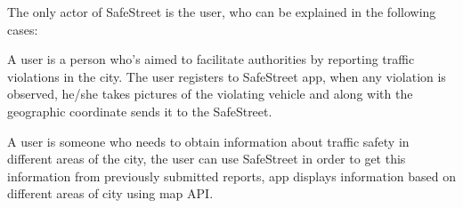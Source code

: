 The only actor of SafeStreet is the user, who can be explained in the following cases:

A user is a person who's aimed to facilitate authorities by reporting traffic violations in the city. The user registers to SafeStreet app, when any violation is observed, he/she takes pictures of the violating vehicle and along with the geographic coordinate sends it to the SafeStreet.

A user is someone who needs to obtain information about traffic safety in different areas of the city, the user can use SafeStreet in order to get this information from previously submitted reports, app displays information based on different areas of city using map API.
